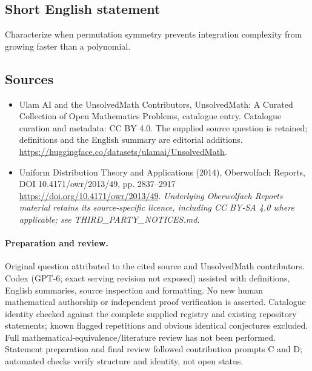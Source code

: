 \documentclass[11pt]{article}
\begin{document}
\subsection{Short English statement}
Characterize when permutation symmetry prevents integration complexity from growing faster than a polynomial.
\subsection{Sources}
\begin{itemize}
\item[\hypertarget{source:statement:1}{S1}] Ulam AI and the UnsolvedMath Contributors, UnsolvedMath: A Curated Collection of Open Mathematics Problems, catalogue entry. Catalogue curation and metadata: CC BY 4.0. The supplied source question is retained; definitions and the English summary are editorial additions.
\url{https://huggingface.co/datasets/ulamai/UnsolvedMath}.
\item[\hypertarget{source:statement:2}{S2}] Uniform Distribution Theory and Applications (2014), Oberwolfach Reports, DOI 10.4171/owr/2013/49, pp. 2837--2917
\url{https://doi.org/10.4171/owr/2013/49}.
\textit{Underlying Oberwolfach Reports material retains its source-specific licence, including CC BY-SA 4.0 where applicable; see THIRD\_PARTY\_NOTICES.md.}
\end{itemize}
\paragraph{Preparation and review.}
Original question attributed to the cited source and UnsolvedMath contributors. Codex (GPT-6; exact serving revision not exposed) assisted with definitions, English summaries, source inspection and formatting. No new human mathematical authorship or independent proof verification is asserted. Catalogue identity checked against the complete supplied registry and existing repository statements; known flagged repetitions and obvious identical conjectures excluded. Full mathematical-equivalence/literature review has not been performed. Statement preparation and final review followed contribution prompts C and D; automated checks verify structure and identity, not open status.
\label{end:statement}
\end{document}
